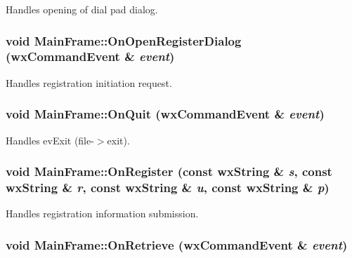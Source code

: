 Handles opening of dial pad dialog. 

\hypertarget{classMainFrame_5981c8c376f0b84971cd2f0574046ec7}{
\subsubsection[{OnOpenRegisterDialog}]{\setlength{\rightskip}{0pt plus 5cm}void MainFrame::OnOpenRegisterDialog (wxCommandEvent \& {\em event})}}
\label{classMainFrame_5981c8c376f0b84971cd2f0574046ec7}


Handles registration initiation request. 

\hypertarget{classMainFrame_6c21335bf2a3393f54b46889c8a559e5}{
\subsubsection[{OnQuit}]{\setlength{\rightskip}{0pt plus 5cm}void MainFrame::OnQuit (wxCommandEvent \& {\em event})}}
\label{classMainFrame_6c21335bf2a3393f54b46889c8a559e5}


Handles evExit (file-$>$exit). 

\hypertarget{classMainFrame_b287a8d769abe22d71300beb96b14f03}{
\subsubsection[{OnRegister}]{\setlength{\rightskip}{0pt plus 5cm}void MainFrame::OnRegister (const wxString \& {\em s}, \/  const wxString \& {\em r}, \/  const wxString \& {\em u}, \/  const wxString \& {\em p})}}
\label{classMainFrame_b287a8d769abe22d71300beb96b14f03}


Handles registration information submission. 

\hypertarget{classMainFrame_0972eb674b39fe851271e432c2d0eb6c}{
\subsubsection[{OnRetrieve}]{\setlength{\rightskip}{0pt plus 5cm}void MainFrame::OnRetrieve (wxCommandEvent \& {\em event})}}
\label{classMainFrame_0972eb674b39fe851271e432c2d0eb6c}


